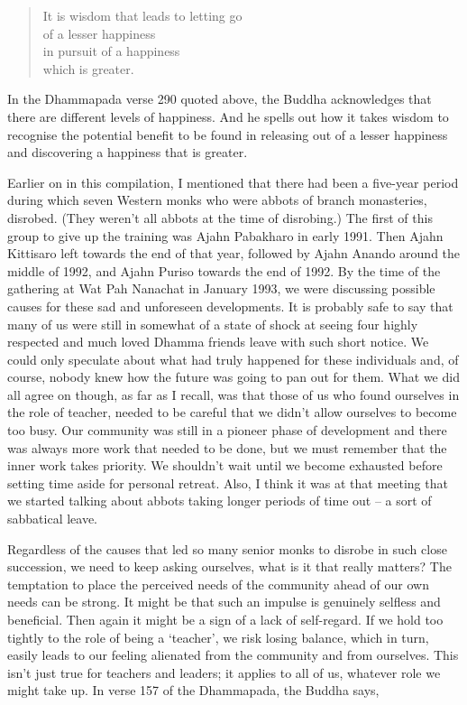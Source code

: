 \begin{quote}
  It is wisdom that leads to letting go\\
  of a lesser happiness\\
  in pursuit of a happiness\\
  which is greater.
\end{quote}

In the Dhammapada verse 290 quoted above, the Buddha acknowledges that
there are different levels of happiness. And he spells out how it takes
wisdom to recognise the potential benefit to be found in releasing out
of a lesser happiness and discovering a happiness that is greater.

\sectionBreak

Earlier on in this compilation, I mentioned that there had been a
five-year period during which seven Western monks who were abbots of
branch monasteries, disrobed. (They weren't all abbots at the time of
disrobing.) The first of this group to give up the training was Ajahn
Pabakharo in early 1991. Then Ajahn Kittisaro left towards the end of
that year, followed by Ajahn Anando around the middle of 1992, and Ajahn
Puriso towards the end of 1992. By the time of the gathering at Wat Pah
Nanachat in January 1993, we were discussing possible causes for these
sad and unforeseen developments. It is probably safe to say that many of
us were still in somewhat of a state of shock at seeing four highly
respected and much loved Dhamma friends leave with such short notice. We
could only speculate about what had truly happened for these individuals
and, of course, nobody knew how the future was going to pan out for
them. What we did all agree on though, as far as I recall, was that
those of us who found ourselves in the role of teacher, needed to be
careful that we didn't allow ourselves to become too busy. Our community
was still in a pioneer phase of development and there was always more
work that needed to be done, but we must remember that the inner work
takes priority. We shouldn't wait until we become exhausted before
setting time aside for personal retreat. Also, I think it was at that
meeting that we started talking about abbots taking longer periods of
time out -- a sort of sabbatical leave.

Regardless of the causes that led so many senior monks to disrobe in
such close succession, we need to keep asking ourselves, what is it that
really matters? The temptation to place the perceived needs of the
community ahead of our own needs can be strong. It might be that such an
impulse is genuinely selfless and beneficial. Then again it might be a
sign of a lack of self-regard. If we hold too tightly to the role of
being a `teacher', we risk losing balance, which in turn, easily leads
to our feeling alienated from the community and from ourselves. This
isn't just true for teachers and leaders; it applies to all of us,
whatever role we might take up. In verse 157 of the Dhammapada, the
Buddha says,

